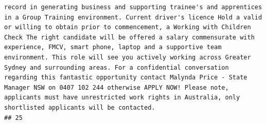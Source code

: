 \documentclass[11pt,a4paper,]{article}
\begin{document}
\begin{verbatim}
record in generating business and supporting trainee's and apprentices in a Group Training environment. Current driver's licence Hold a valid or willing to obtain prior to commencement, a Working with Children Check The right candidate will be offered a salary commensurate with experience, FMCV, smart phone, laptop and a supportive team environment. This role will see you actively working across Greater Sydney and surrounding areas. For a confidential conversation regarding this fantastic opportunity contact Malynda Price - State Manager NSW on 0407 102 244 otherwise APPLY NOW! Please note, applicants must have unrestricted work rights in Australia, only shortlisted applicants will be contacted.
## 25                                                                                                                                                                                                                                                                                                                                                                                                                                                                                                                                                                                                                                                                                                                                                                                                                                                                                                                                                                                                                                                                                                                                                                                                                                                                                                                                                                                                                                                                                                                                                                                                                                                                                                                                                                                                                                                                                                                                                                                                                                                                                                                                                                                                                                                                                                                                                                                                                                                                                                                                                                                                                                                                                                                 
\end{verbatim}
\end{document}
